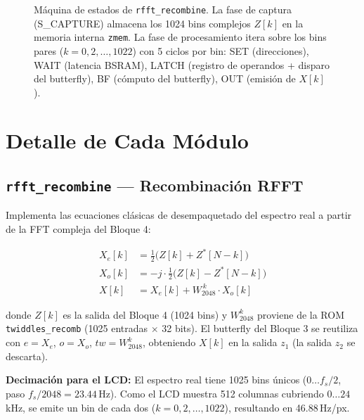 \documentclass[12pt, a4paper]{article}
\begin{document}
\begin{landscape}
\begin{figure}[H]
\begin{tikzpicture}
\end{tikzpicture}
\caption{Máquina de estados de \texttt{rfft\_recombine}. La fase de captura
         (S\_CAPTURE) almacena los 1024 bins complejos $Z[k]$ en la memoria
         interna \texttt{zmem}. La fase de procesamiento itera sobre los bins
         pares ($k=0,2,\ldots,1022$) con 5 ciclos por bin: SET (direcciones),
         WAIT (latencia BSRAM), LATCH (registro de operandos + disparo del
         butterfly), BF (cómputo del butterfly), OUT (emisión de $X[k]$).}
\label{fig:recomb_fsm}
\end{figure}
\end{landscape}

\section{Detalle de Cada Módulo}

\subsection{\texttt{rfft\_recombine} — Recombinación RFFT}

Implementa las ecuaciones clásicas de desempaquetado del espectro real a
partir de la FFT compleja del Bloque 4:

\begin{align}
    X_e[k] &= \tfrac{1}{2}\bigl(Z[k] + Z^*[N-k]\bigr) \\
    X_o[k] &= -j \cdot \tfrac{1}{2}\bigl(Z[k] - Z^*[N-k]\bigr) \\
    X[k]   &= X_e[k] + W_{2048}^{\,k} \cdot X_o[k]
\end{align}

\noindent donde $Z[k]$ es la salida del Bloque 4 (1024 bins) y $W_{2048}^k$
proviene de la ROM \texttt{twiddles\_recomb} (1025 entradas $\times$ 32 bits).
El butterfly del Bloque 3 se reutiliza con $e = X_e$, $o = X_o$,
$tw = W_{2048}^k$, obteniendo $X[k]$ en la salida $z_1$ (la salida $z_2$ se
descarta).

\textbf{Decimación para el LCD:} El espectro real tiene 1025 bins únicos
($0\ldots f_s/2$, paso $f_s/2048 = 23.44$\,Hz). Como el LCD muestra 512
columnas cubriendo $0\ldots24$\,kHz, se emite un bin de cada dos
($k = 0, 2, \ldots, 1022$), resultando en 46.88\,Hz/px.
\end{document}
